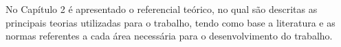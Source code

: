         No Capítulo 2 é apresentado o referencial teórico, no qual são descritas as principais teorias utilizadas para o trabalho, tendo como base  a literatura e as normas referentes a cada área necessária para o desenvolvimento do trabalho.\\
        


